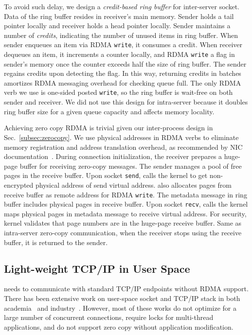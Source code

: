 To avoid such delay, we design a \textit{credit-based ring buffer} for inter-server socket. Data of the ring buffer resides in receiver's main memory. Sender holds a tail pointer locally and receiver holds a head pointer locally. Sender maintains a number of \textit{credits}, indicating the number of unused items in ring buffer. When sender enqueues an item via RDMA \texttt{write}, it consumes a credit. When receiver dequeues an item, it increments a counter locally, and RDMA \texttt{write} a flag in sender's memory once the counter exceeds half the size of ring buffer. The sender regains credits upon detecting the flag. In this way, returning credits in batches amortizes RDMA messaging overhead for checking queue full. The only RDMA verb we use is one-sided posted \texttt{write}, so the ring buffer is wait-free on both sender and receiver. We did not use this design for intra-server because it doubles ring buffer size for a given queue capacity and affects memory locality.

Achieving zero copy RDMA is trivial given our inter-process design in Sec.~\ref{subsec:zerocopy}. We use physical addresses in RDMA verbs to eliminate memory registration and address translation overhead, as recommended by NIC documentation~\cite{mellanox}. During connection initialization, the receiver prepares a huge-page buffer for receiving zero-copy messages. The sender manages a pool of free pages in the receive buffer. Upon socket \texttt{send}, \libipc calls the kernel to get non-encrypted physical address of send virtual address. \libipc also allocates pages from receive buffer as remote address for RDMA \texttt{write}. The metadata message in ring buffer includes physical pages in receive buffer. Upon socket \texttt{recv}, \libipc calls the kernel maps physical pages in metadata message to receive virtual address. For security, kernel validates that page numbers are in the huge-page receive buffer. Same as intra-server zero-copy communication, when the receiver stops using the receive buffer, it is returned to the sender.


\subsection{Light-weight TCP/IP in User Space}

\sys{} needs to communicate with standard TCP/IP endpoints without RDMA support. There has been extensive work on user-space socket and TCP/IP stack in both academia~\cite{dunkels2001design,rizzo2012netmap,huang2017high} and industry~\cite{libvma,openonload,dbl}. However, most of these works do not optimize for a large number of concurrent connections, require locks for multi-thread applications, and do not support zero copy without application modification.

